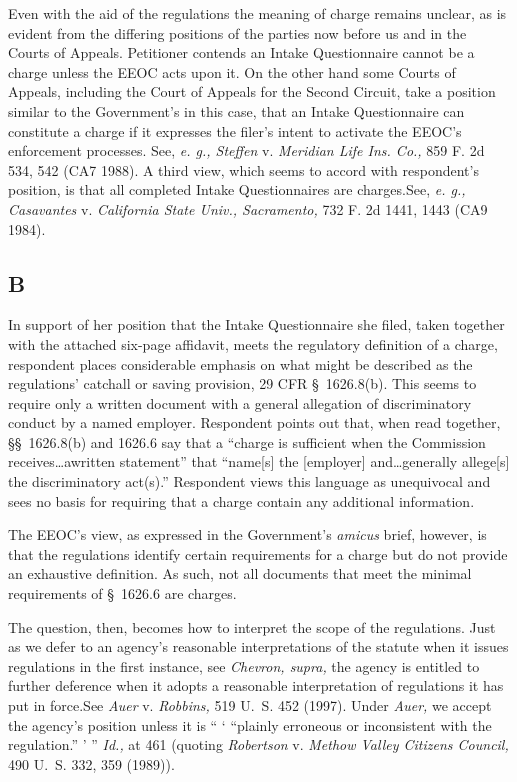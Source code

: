   Even with the aid of the regulations the meaning of charge remains
unclear, as is evident from the differing positions of the parties now
before us and in the Courts of Appeals. Petitioner contends an Intake
Questionnaire cannot be a charge unless the EEOC acts upon it. On the
other hand some Courts of Appeals, including the Court of Appeals for
the Second Circuit, take a position similar to the Government's in
this case, that an Intake Questionnaire can constitute a charge if it
expresses the filer's intent to activate the EEOC's enforcement
processes. See, \emph{e. g., Steffen} v. \emph{Meridian Life Ins. Co.,} 859
F. 2d 534, 542 (CA7 1988). A third view, which seems to accord with
respondent's position, is that all completed Intake Questionnaires
are charges.See, \emph{e. g., Casavantes} v. \emph{California State Univ.,
Sacramento,} 732 F. 2d 1441, 1443 (CA9 1984).

\subsection{B}

  In support of her position that the Intake Questionnaire she filed,
taken together with the attached six-page affidavit, meets the
regulatory definition of a charge, respondent places considerable
emphasis on what might be described as the regulations' catchall or
saving provision, 29 CFR \S~1626.8(b). This seems to require only
a written document \newpage  with a general allegation of discriminatory
conduct by a named employer. Respondent points out that, when
read together, \S\S~1626.8(b) and 1626.6 say that a ``charge is
sufficient when the Commission receives\dots awritten statement''
that ``name[s] the [employer] and\dots generally allege[s] the
discriminatory act(s).'' Respondent views this language as unequivocal
and sees no basis for requiring that a charge contain any additional
information.

  The EEOC's view, as expressed in the Government's \emph{amicus}
brief, however, is that the regulations identify certain requirements
for a charge but do not provide an exhaustive definition. As such, not
all documents that meet the minimal requirements of \S~1626.6 are
charges.

  The question, then, becomes how to interpret the scope of
the regulations. Just as we defer to an agency's reasonable
interpretations of the statute when it issues regulations in the first
instance, see \emph{Chevron, supra,} the agency is entitled to further
deference when it adopts a reasonable interpretation of regulations it
has put in force.See \emph{Auer} v. \emph{Robbins,} 519 U.~S. 452 (1997).
Under \emph{Auer,} we accept the agency's position unless it is `` ‘
``plainly erroneous or inconsistent with the regulation.'' ' ''
\emph{Id.,} at 461 (quoting \emph{Robertson} v. \emph{Methow Valley Citizens
Council,} 490 U.~S. 332, 359 (1989)).

